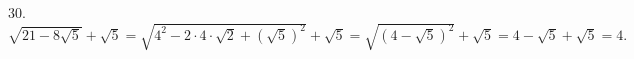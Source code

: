 30. $\sqrt{21-8\sqrt{5}}+\sqrt{5}=\sqrt{4^2-2\cdot4\cdot\sqrt{2}+(\sqrt{5})^2}+\sqrt{5}=\sqrt{(4-\sqrt{5})^2}+\sqrt{5}=
4-\sqrt{5}+\sqrt{5}=4.$\\
